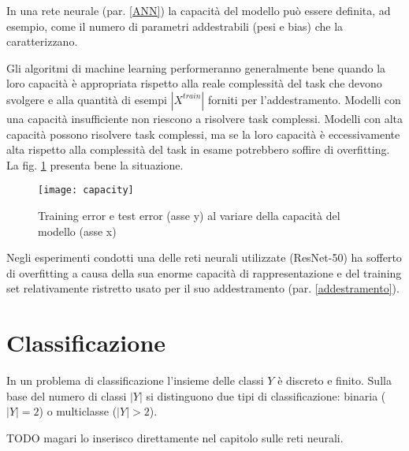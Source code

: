 In una rete neurale (par. \ref{ANN}) la capacità del modello può essere definita, ad esempio, come il numero di parametri addestrabili (pesi e bias) che la caratterizzano.

Gli algoritmi di machine learning performeranno generalmente bene quando la loro capacità è appropriata rispetto alla reale complessità del task che devono svolgere e alla quantità di esempi $|X^{train}|$ forniti per l'addestramento. Modelli con una capacità insufficiente non riescono a risolvere task complessi. Modelli con alta capacità possono risolvere task complessi, ma se la loro capacità è eccessivamente alta rispetto alla complessità del task in esame potrebbero soffire di overfitting. La fig. \ref{fig:capacity} presenta bene la situazione.

\begin{figure}[h]
\centering
\texttt{[image: capacity]}
\caption{Training error e test error (asse y) al variare della capacità del modello (asse x)}
\label{fig:capacity}
\end{figure}

Negli esperimenti condotti una delle reti neurali utilizzate (ResNet-50) ha sofferto di overfitting a causa della sua enorme capacità di rappresentazione e del training set relativamente ristretto usato per il suo addestramento (par. \ref{addestramento}).

\section{Classificazione}
\label{classificazione}
In un problema di classificazione l’insieme delle classi $Y$ è discreto e finito.
Sulla base del numero di classi $|Y|$ si distinguono due tipi di classificazione: binaria ($|Y|=2$) o multiclasse ($|Y|>2$).

TODO magari lo inserisco direttamente nel capitolo sulle reti neurali.









